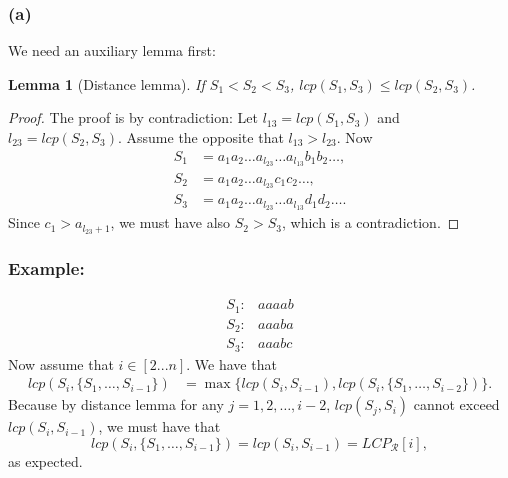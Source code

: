\documentclass[10pt]{article}
\newtheorem{lemma}{Lemma}
\begin{document}
\subsubsection*{(a)}
We need an auxiliary lemma first: 
\begin{lemma}[Distance lemma]
If $S_1 < S_2 < S_3$, $lcp(S_1, S_3) \leq lcp(S_2, S_3)$.
\end{lemma}
\begin{proof}
The proof is by contradiction: Let $l_{13} = lcp(S_1, S_3)$ and $l_{23} = lcp(S_2, S_3)$. Assume the opposite that $l_{13} > l_{23}$. 
Now 
\begin{align*}
S_1 &= a_1 a_2 \dots a_{l_{23}} \dots a_{l_{13}} b_1 b_2 \dots, \\
S_2 &= a_1 a_2 \dots a_{l_{23}} c_1 c_2 \dots, \\
S_3 &= a_1 a_2 \dots a_{l_{23}} \dots a_{l_{13}} d_1 d_2 \dots.
\end{align*}
Since $c_1 > a_{l_{23} + 1}$, we must have also $S_2 > S_3$, which is a contradiction.
\end{proof}
\subsubsection*{Example:}
\begin{align*}
S_1: & aaaab \\
S_2: & aaaba \\
S_3: & aaabc
\end{align*}
Now assume that $i \in [2...n]$. We have that
\begin{align*}
lcp(S_i, \{ S_1, \dots, S_{i - 1} \}) &= \max \{ lcp(S_i, S_{i - 1}), lcp(S_i, \{ S_1, \dots, S_{i - 2} \}) \}.
\end{align*}
Because by distance lemma for any $j = 1, 2, \dots, i - 2$, $lcp(S_j, S_i)$ cannot exceed $lcp(S_i, S_{i - 1})$, we must have that 
\[
lcp(S_i, \{ S_1, \dots, S_{i - 1} \}) = lcp(S_i, S_{i - 1}) = LCP_{\mathcal{R}}[i],
\] 
as expected.
\end{document}
